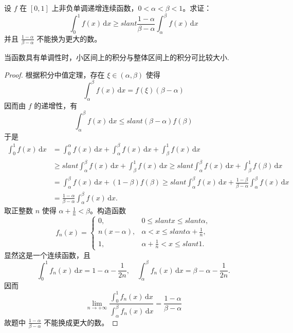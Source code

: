 \documentclass[../../main.tex]{subfiles}
\begin{document}
\begin{example}
设 \( f \) 在 \([0,1]\) 上非负单调递增连续函数，\( 0 < \alpha < \beta < 1 \)。求证：
\[
\int_{0}^{1} f(x) \, \mathrm{d}x \geqslant slant \frac{1 - \alpha}{\beta - \alpha} \int_{\alpha}^{\beta} f(x) \, \mathrm{d}x
\]
并且 \( \frac{1 - \alpha}{\beta - \alpha} \) 不能换为更大的数。
\end{example}
\begin{remark}
当函数具有单调性时，小区间上的积分与整体区间上的积分可比较大小.
\end{remark}
\begin{proof}
根据积分中值定理，存在 \( \xi \in (\alpha, \beta) \) 使得
\[
\int_{\alpha}^{\beta} f(x) \, \mathrm{d}x = f(\xi)(\beta - \alpha)
\]
因而由 \( f \) 的递增性，有
\[
\int_{\alpha}^{\beta} f(x) \, \mathrm{d}x \leqslant slant (\beta - \alpha)f(\beta)
\]
于是
\begin{align*}
\int_{0}^{1} f(x) \, \mathrm{d}x &= \int_{0}^{\alpha} f(x) \, \mathrm{d}x + \int_{\alpha}^{\beta} f(x) \, \mathrm{d}x + \int_{\beta}^{1} f(x) \, \mathrm{d}x \\
&\geqslant slant \int_{\alpha}^{\beta} f(x) \, \mathrm{d}x + \int_{\beta}^{1} f(x) \, \mathrm{d}x \geqslant slant \int_{\alpha}^{\beta} f(x) \, \mathrm{d}x + \int_{\beta}^{1} f(\beta) \, \mathrm{d}x \\
&= \int_{\alpha}^{\beta} f(x) \, \mathrm{d}x + (1 - \beta)f(\beta) \geqslant slant \int_{\alpha}^{\beta} f(x) \, \mathrm{d}x + \frac{1 - \beta}{\beta - \alpha} \int_{\alpha}^{\beta} f(x) \, \mathrm{d}x \\
&= \frac{1 - \alpha}{\beta - \alpha} \int_{\alpha}^{\beta} f(x) \, \mathrm{d}x.
\end{align*}
取正整数 \( n \) 使得 \( \alpha + \frac{1}{n} < \beta \)。构造函数
\[
f_n(x) = \begin{cases} 
0, & 0 \leqslant slant x \leqslant slant \alpha, \\
n(x - \alpha), & \alpha < x \leqslant slant \alpha + \frac{1}{n}, \\
1, & \alpha + \frac{1}{n} < x \leqslant slant 1 .
\end{cases}
\]
显然这是一个连续函数，且
\[
\int_{0}^{1} f_n(x) \, \mathrm{d}x = 1 - \alpha - \frac{1}{2n}, \quad \int_{\alpha}^{\beta} f_n(x) \, \mathrm{d}x = \beta - \alpha - \frac{1}{2n}.
\]
因而
\[
\lim_{n \to +\infty} \frac{\int_{0}^{1} f_n(x) \, \mathrm{d}x}{\int_{\alpha}^{\beta} f_n(x) \, \mathrm{d}x} = \frac{1 - \alpha}{\beta - \alpha}
\]
故题中 \( \frac{1 - \alpha}{\beta - \alpha} \) 不能换成更大的数。
\end{proof}
\end{document}
